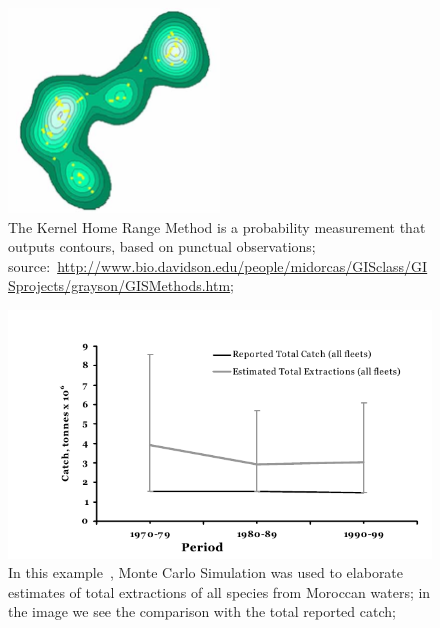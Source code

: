 \documentclass[11pt]{article} %
\begin{document}
  \begin{figure}[!ht]%
    \begin{center} 
	\includegraphics[width=0.5\textwidth]{kernel}
      \caption[The Kernel Home Range Method is a probability measurement that outputs contours, based on punctual observations;]
{The Kernel Home Range Method is a probability measurement that outputs contours, based on punctual observations; source:~\url{http://www.bio.davidson.edu/people/midorcas/GISclass/GISprojects/grayson/GISMethods.htm};}
      \label{kernel} %
    \end{center} 
  \end{figure}

  \begin{figure}[!ht]%
    \begin{center} 
	\includegraphics[width=\textwidth]{montecarlo}
      \caption[In this example, Monte Carlo Simulation was used to elaborate estimates of total extractions of all species from Moroccan waters; in the image we see the comparison with the total reported catch;]
{In this example~\cite{morocco}, Monte Carlo Simulation was used to elaborate estimates of total extractions of all species from Moroccan waters; in the image we see the comparison with the total reported catch;}
      \label{montecarlo} %
    \end{center} 
  \end{figure}
\end{document}

